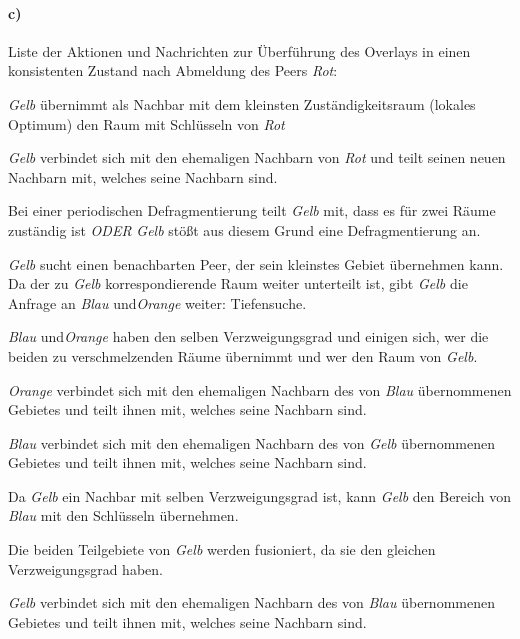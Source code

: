 \documentclass[10pt,a4paper]{article}
\begin{document}
\paragraph*{c)} Liste der Aktionen und Nachrichten zur Überführung des Overlays in einen konsistenten Zustand nach Abmeldung des Peers \textit{Rot}:
\begin{compactitem}[–]
\item \textit{Gelb} übernimmt als Nachbar mit dem kleinsten Zuständigkeitsraum (lokales Optimum) den Raum mit Schlüsseln von \textit{Rot}
\item \textit{Gelb} verbindet sich mit den ehemaligen Nachbarn von \textit{Rot} und teilt seinen neuen Nachbarn mit, welches seine Nachbarn sind.
\item Bei einer periodischen Defragmentierung teilt \textit{Gelb} mit, dass es für zwei Räume zuständig ist \textit{ODER} \textit{Gelb} stößt aus diesem Grund eine Defragmentierung an.
\item \textit{Gelb} sucht einen benachbarten Peer, der sein kleinstes Gebiet übernehmen kann. Da der zu \textit{Gelb} korrespondierende Raum weiter unterteilt ist, gibt \textit{Gelb} die Anfrage an \textit{Blau} und\textit{Orange} weiter: Tiefensuche.
\begin{compactitem}
	\item \textit{Blau} und\textit{Orange} haben den selben Verzweigungsgrad und einigen sich, wer die beiden zu verschmelzenden Räume übernimmt und wer den Raum von \textit{Gelb}.
	\item \textit{Orange} verbindet sich mit den ehemaligen Nachbarn des von \textit{Blau} übernommenen Gebietes und teilt ihnen mit, welches seine Nachbarn sind.
	\item \textit{Blau} verbindet sich mit den ehemaligen Nachbarn des von \textit{Gelb} übernommenen Gebietes und teilt ihnen mit, welches seine Nachbarn sind.
\end{compactitem}
\item Da \textit{Gelb} ein Nachbar mit selben Verzweigungsgrad ist, kann \textit{Gelb} den Bereich von \textit{Blau} mit den Schlüsseln übernehmen.
\item Die beiden Teilgebiete von \textit{Gelb} werden fusioniert, da sie den gleichen Verzweigungsgrad haben.
\item \textit{Gelb} verbindet sich mit den ehemaligen Nachbarn des von \textit{Blau} übernommenen Gebietes und teilt ihnen mit, welches seine Nachbarn sind.
\end{compactitem}
\end{document}
